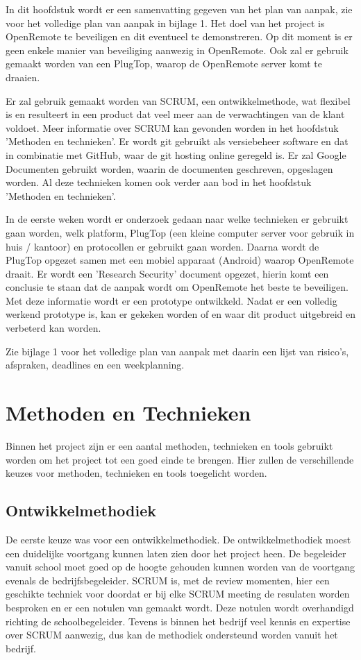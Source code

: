 \documentclass[]{article}
\begin{document}
In dit hoofdstuk wordt er een samenvatting gegeven van het plan van aanpak,
zie voor het volledige plan van aanpak in bijlage 1. Het doel van het 
project is OpenRemote  te  beveiligen  en  dit  eventueel  te
demonstreren. Op dit moment is er geen enkele manier van beveiliging aanwezig
in OpenRemote. Ook zal er gebruik gemaakt worden van een PlugTop, waarop  de
OpenRemote server komt te draaien.

Er zal gebruik gemaakt worden van  SCRUM, een ontwikkelmethode, wat flexibel is en resulteert in een product dat  veel
meer aan de verwachtingen van de klant voldoet. Meer informatie  over  SCRUM
kan gevonden worden in het hoofdstuk 'Methoden en technieken'.
Er wordt git gebruikt als versiebeheer software en  dat  in  combinatie  met
GitHub, waar de git hosting online geregeld is.  Er  zal  Google  Documenten
gebruikt worden, waarin de documenten geschreven, opgeslagen worden.
Al deze technieken komen ook verder aan bod in het  hoofdstuk  'Methoden  en
technieken'.

In de eerste weken wordt  er  onderzoek  gedaan  naar  welke  technieken  er
gebruikt gaan worden, welk platform,  PlugTop (een kleine computer server voor gebruik in huis / kantoor)  en  protocollen  er  gebruikt
gaan worden. Daarna wordt de PlugTop opgezet samen met een  mobiel  apparaat
(Android)  waarop  OpenRemote  draait. Er wordt een 'Research  Security'
document opgezet, hierin komt een conclusie te staan dat de aanpak wordt  om
OpenRemote het beste  te  beveiligen.  Met  deze  informatie  wordt  er  een
prototype ontwikkeld. Nadat er een volledig werkend  prototype  is,  kan  er
gekeken worden of en waar dit product uitgebreid en verbeterd kan worden.

Zie bijlage 1 voor het volledige plan van aanpak met daarin een lijst  van
risico's,  afspraken,  deadlines  en  een weekplanning.

\newpage
\section{Methoden en Technieken}

Binnen het project zijn er een aantal methoden, technieken en tools
gebruikt worden om het project tot een goed einde te brengen. Hier zullen de
verschillende keuzes voor methoden, technieken en tools toegelicht worden.

\subsection{Ontwikkelmethodiek}
De eerste keuze was voor een ontwikkelmethodiek. De ontwikkelmethodiek
moest een duidelijke voortgang kunnen laten zien door het project heen. De
begeleider vanuit school moet goed op de hoogte gehouden kunnen worden van
de voortgang evenals de bedrijfsbegeleider. SCRUM is, met de review
momenten, hier een geschikte techniek voor doordat er bij elke SCRUM meeting de
resulaten worden besproken en er een notulen van gemaakt wordt. Deze notulen wordt
overhandigd richting de schoolbegeleider. Tevens is binnen het bedrijf veel
kennis en expertise over SCRUM aanwezig, dus kan de methodiek ondersteund worden
vanuit het bedrijf.
\end{document}
